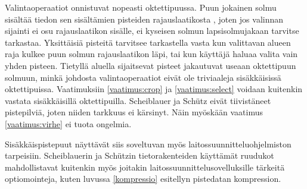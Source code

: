 Valintaoperaatiot onnistuvat nopeasti oktettipuussa. Puun jokainen solmu sisältää tiedon sen sisältämien pisteiden rajauslaatikosta , joten jos valinnan sijainti ei osu rajauslaatikon sisälle, ei kyseisen solmun lapsisolmujakaan tarvitse tarkastaa. Yksittäisiä pisteitä tarvitsee tarkastella vasta kun valittavan alueen raja kulkee puun solmun rajauslaatikon läpi, tai kun käyttäjä haluaa valita vain yhden pisteen. Tietyllä aluella sijaitsevat pisteet jakautuvat useaan oktettipuun solmuun, minkä johdosta valintaoperaatiot eivät ole triviaaleja sisäkkäisissä oktettipuissa. Vaatimuksiin \ref{vaatimus:crop} ja \ref{vaatimus:select} voidaan kuitenkin vastata sisäkkäisillä oktettipuilla. Scheiblauer ja Schütz eivät tiivistäneet pistepilviä, joten niiden tarkkuus ei kärsinyt. Näin myöskään vaatimus \ref{vaatimus:virhe} ei tuota ongelmia.

Sisäkkäispistepuut näyttävät siis soveltuvan myös laitossuunnitteluohjelmiston tarpeisiin. Scheiblauerin ja Schützin tietorakenteiden käyttämät ruudukot mahdollistavat kuitenkin myös joitakin laitossuunnittelusovelluksille tärkeitä optiomointeja, kuten luvussa \ref{kompressio} esitellyn pistedatan kompression.
